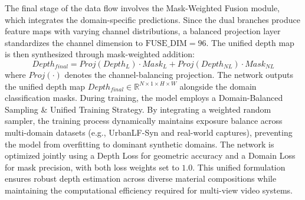\documentclass[lettersize,journal]{IEEEtran}
\begin{document}
The final stage of the data flow involves the Mask-Weighted Fusion module, which integrates the domain-specific predictions. Since the dual branches produce feature maps with varying channel distributions, a balanced projection layer standardizes the channel dimension to $\text{FUSE\_DIM}=96$. The unified depth map is then synthesized through mask-weighted addition:
\begin{equation}
Depth_{final} = Proj(Depth_L) \cdot Mask_L + Proj(Depth_{NL}) \cdot Mask_{NL}
\end{equation}
where $Proj(\cdot)$ denotes the channel-balancing projection. The network outputs the unified depth map $Depth_{final} \in \mathbb{R}^{N \times 1 \times H \times W}$ alongside the domain classification masks. During training, the model employs a Domain-Balanced Sampling \& Unified Training Strategy. By integrating a weighted random sampler, the training process dynamically maintains exposure balance across multi-domain datasets (e.g., UrbanLF-Syn and real-world captures), preventing the model from overfitting to dominant synthetic domains. The network is optimized jointly using a Depth Loss for geometric accuracy and a Domain Loss for mask precision, with both loss weights set to $1.0$. This unified formulation ensures robust depth estimation across diverse material compositions while maintaining the computational efficiency required for multi-view video systems.
\end{document}
